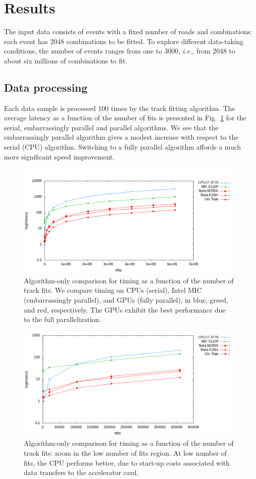 \documentclass[journal]{IEEEtran}
\begin{document}
\section{Results}
The input data consists of events with a fixed number of roads and
combinations: each event has 2048 combinations to be fitted. To
explore different data-taking conditions, the number of events ranges
from one to 3000, \emph{i.e.,} from 2048 to about six millions of combinations
to fit.
 
\subsection{Data processing}
Each data sample is processed 100 times by the track fitting algorithm. 
The average latency as a function of the number of fits is presented in 
Fig.~\ref{fig:algo_only_timing} for the serial,
embarrassingly parallel and parallel algorithms. We see that the
embarrassingly parallel algorithm gives a modest increase with respect
to the serial (CPU) algorithm. Switching to a fully parallel algorithm
affords a much more significant speed improvement. 
\begin{figure}[!t]
  \centering
  \includegraphics[width=0.9\linewidth]{figures/TimeComp_MIC}
  \caption{Algorithm-only comparison for timing as a function of the
    number of track fits. We compare timing on CPUs (serial), Intel
    MIC (embarrassingly parallel), and GPUs (fully parallel), in
    blue, greed, and red, respectively. The GPUs exhibit the best
    performance due to the full parallelization. }
  \label{fig:algo_only_timing}
\end{figure}
\begin{figure}[!t]
  \centering
  \includegraphics[width=0.9\linewidth]{figures/TimeCompZoom_MIC.png} 
  \caption{Algorithm-only comparison for timing as a function of the
    number of track fits: zoom in the low number of fits region. At
    low number of fits, the CPU performs better, due to start-up
    costs associated with data transfers to the accelerator card.}
  \label{fig:algo_only_timing_zoom}
\end{figure}
\end{document}
